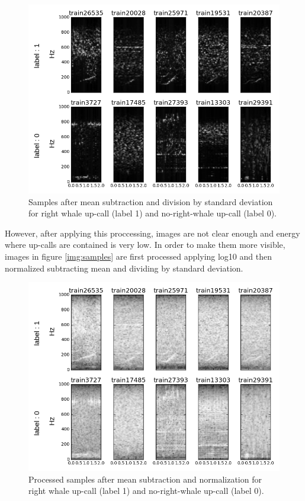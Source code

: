 \documentclass[]{article}
\begin{document}
\begin{figure}[htpb!]
\centering
\includegraphics[width= \textwidth]{./images/2_samples_unprocessed}
\caption{ Samples after mean subtraction and division by standard deviation for right whale up-call (label 1) and no-right-whale up-call (label 0).  \label{img:samples_unprocessed}}
\end{figure} 

However, after applying this proccessing, images are not clear enough and energy where up-calls are contained is very low. In order to make them more visible, images in figure \ref{img:samples} are first processed applying log10 and then normalized subtracting mean and dividing by standard deviation.

\begin{figure}[htpb!]
\centering
\includegraphics[width= \textwidth]{./images/2_samples_processed}
\caption{Processed samples after mean subtraction and normalization for right whale up-call (label 1) and no-right-whale up-call (label 0).  \label{img:samples_processed}}
\end{figure} 
\end{document}
